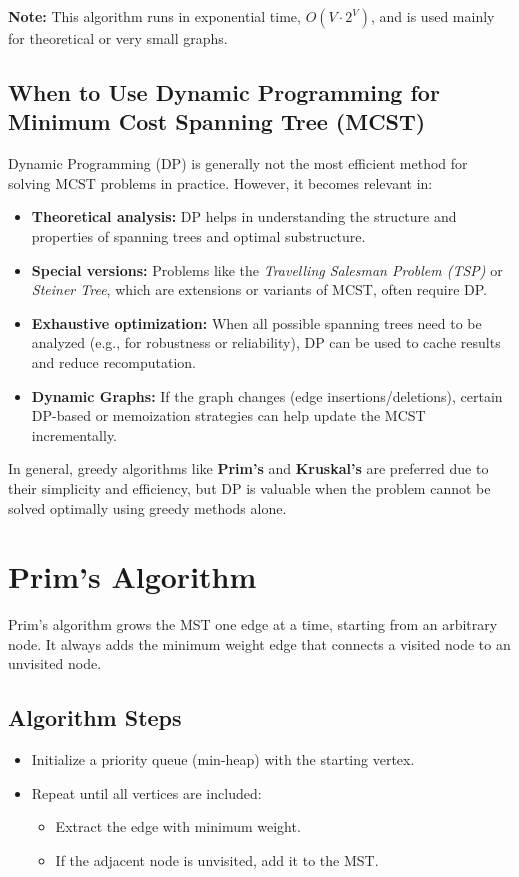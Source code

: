 \documentclass[14pt,a4paper]{extarticle}
\begin{document}
\vspace{1em}
\textbf{Note:} This algorithm runs in exponential time, \(O(V \cdot 2^V)\), and is used mainly for theoretical or very small graphs.

\newpage
\subsection{When to Use Dynamic Programming for Minimum Cost Spanning Tree (MCST)}

Dynamic Programming (DP) is generally not the most efficient method for solving MCST problems in practice. However, it becomes relevant in:

\begin{itemize}
    \item \textbf{Theoretical analysis:} DP helps in understanding the structure and properties of spanning trees and optimal substructure.
    \item \textbf{Special versions:} Problems like the \textit{Travelling Salesman Problem (TSP)} or \textit{Steiner Tree}, which are extensions or variants of MCST, often require DP.
    \item \textbf{Exhaustive optimization:} When all possible spanning trees need to be analyzed (e.g., for robustness or reliability), DP can be used to cache results and reduce recomputation.
    \item \textbf{Dynamic Graphs:} If the graph changes (edge insertions/deletions), certain DP-based or memoization strategies can help update the MCST incrementally.
\end{itemize}

\noindent
In general, greedy algorithms like \textbf{Prim’s} and \textbf{Kruskal’s} are preferred due to their simplicity and efficiency, but DP is valuable when the problem cannot be solved optimally using greedy methods alone.


\newpage
\section{Prim's Algorithm}

Prim's algorithm grows the MST one edge at a time, starting from an arbitrary node. 
It always adds the minimum weight edge that connects a visited node to an unvisited node.

\subsection{Algorithm Steps}
\begin{itemize}
    \item Initialize a priority queue (min-heap) with the starting vertex.
    \item Repeat until all vertices are included:
    \begin{itemize}
        \item Extract the edge with minimum weight.
        \item If the adjacent node is unvisited, add it to the MST.
    \end{itemize}
\end{itemize}
\end{document}
